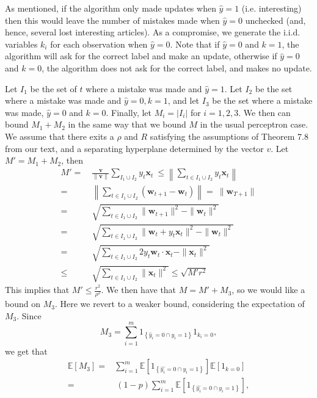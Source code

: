 \documentclass[12pt]{article}
\newcommand{\V}[1]{\boldsymbol{#1}}
\newcommand{\E}[0]{\mathbb{E}}
\begin{document}
As mentioned, if the algorithm only made updates when $\widehat{y}=1$ (i.e. interesting) then this would leave the number of mistakes made when $\widehat{y} = 0$ unchecked (and, hence, several lost interesting articles). As a compromise, we generate the i.i.d. variables $k_i$ for each observation when $\widehat{y} = 0$. Note that if $\hat{y} = 0$ and $k=1$, the algorithm will ask for the correct label and make an update, otherwise if $\hat{y} = 0$ and $k=0$, the algorithm does not ask for the correct label, and makes no update.




Let $I_1$ be the set of $t$ where a mistake was made and
$\hat{y}=1$.  Let $I_2$ be the set where a mistake was made and
$\hat{y} = 0, k = 1$, and let $I_3$ be the set where a mistake was
made, $\hat{y} = 0$ and $k = 0$. Finally, let $M_i = |I_i|$ for $i =
1,2,3$. We then can bound $M_1 + M_2$ in the same way that we bound
$M$ in the usual perceptron case.  We assume that there exits a $\rho$
and $R$ satisfying the assumptions of Theorem 7.8 from our text, and a separating hyperplane determined by the vector $v$. Let $M' = M_1 + M_2$, then
\begin{align*}
M' =&\ \frac{\V{v}}{\|\V{v}\|}\sum_{I_1 \cup I_2} y_t\V{x}_t \
 \leq   \left\|\sum_{t \in I_1 \cup I_2} y_t \V{x}_t\right\| \\
=& \ \left\|\sum_{t \in I_1 \cup I_2} (\V{w}_{t+1} - \V{w}_t) \right\| 
= \ \|\V{w}_{T+1} \| \\
=&\ \sqrt{\sum_{t \in I_1 \cup I_2} \|  \V{w}_{t+1}\|^2 - \|\V{w}_t\|^2 }\\
= &\ \sqrt{\sum_{t \in I_1 \cup I_2} \|  \V{w}_{t} + y_t\V{x}_t\|^2 -
  \|\V{w}_t\|^2 }\\
= &\ \sqrt{\sum_{t \in I_1 \cup I_2} 2y_t\V{w}_t\cdot \V{x}_t -
  \|\V{x}_t\|^2} \\
\leq &\ \sqrt{\sum_{t \in I_1 \cup I_2} \|\V{x}_t\|^2} \leq
\sqrt{M'r^2} \end{align*}
This implies that $M' \leq \frac{r^2}{\rho^2}$.
We then have that $M = M' + M_3$, so we would like a bound on $M_3$.
Here we revert to a weaker bound, considering the expectation of
$M_3$. Since 
\[M_3 = \sum_{i=1}^m 1_{\left\{\hat{y}_i = 0 \cap y_i = 1\right\}}1_{k_i = 0}, \]
we get that
\begin{align*}
\E[M_3] = & \sum_{i=1}^m \E[1_{\left\{\hat{y_i} = 0 \cap y_i = 1\right\}}]\E[1_{k = 0}] \\
 = &\ (1 - p)\sum_{i=1}^m \E[1_{\left\{\hat{y_i} = 0 \cap y_i = 1\right\}}],
\end{align*}
\end{document}
